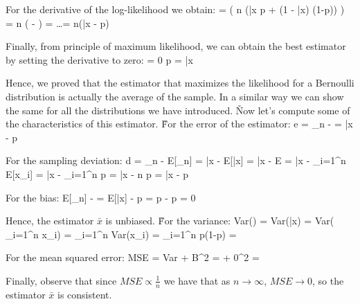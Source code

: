 For the derivative of the log-likelihood we obtain:
\bse
{} =  \Big( n (\bar{x} \ln p + (1 - \bar{x}) \ln(1-p)) \Big) =
n \Big(  -  \Big) =
\ldots = n(\bar{x} - p)
\ese

Finally, from principle of maximum likelihood, we can obtain the best estimator by setting the derivative to zero:
\bse
{} = 0 \Rightarrow p = \bar{x}
\ese

Hence, we proved that the estimator that maximizes the likelihood for a Bernoulli distribution is actually the
average of the sample. In a similar way we can show the same for all the distributions we have introduced. \v

Now let's compute some of the characteristics of this estimator. \v

For the error of the estimator:
\bse
e = \hat{\theta}_{n} - \theta = \bar{x} - p
\ese

For the sampling deviation:
\bse
d = \hat{\theta}_{n} - E[\hat{\theta}_{n}] = \bar{x} - E[\bar{x}] =
\bar{x} - E \Big[ \frac{1}{n} \sum_{i=1}^{n}x_{i} \Big] = \bar{x} -  \sum_{i=1}^{n} E[x_{i}] =
\bar{x} -  \sum_{i=1}^{n} p =
\bar{x} -  n p = \bar{x} - p
\ese

For the bias:
\bse
E[\hat{\theta}_{n}] - \theta = E[\bar{x}] - p = p - p = 0
\ese

Hence, the estimator $\bar{x}$ is unbiased. \v

For the variance:
\bse
Var(\theta) = Var(\bar{x}) = Var( \sum_{i=1}^{n} x_{i}) =  \sum_{i=1}^{n} Var(x_{i}) =
 \sum_{i=1}^{n} p(1-p) = 
\ese

For the mean squared error:
\bse
MSE = Var + B^2 = + 0^2 = 
\ese

Finally, observe that since $MSE \propto \frac{1}{n}$ we have that as $n \to \infty$, $MSE \to 0$, so the estimator
$\bar{x}$ is consistent.
